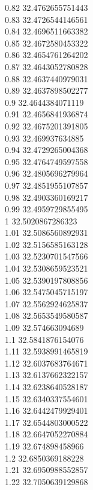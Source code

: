 {0.82	32.4762655751443\\
0.83	32.4726544146561\\
0.84	32.4696511663382\\
0.85	32.4672580453322\\
0.86	32.4654761264202\\
0.87	32.4643052780828\\
0.88	32.4637440979031\\
0.89	32.4637898502277\\
0.9	32.4644384071119\\
0.91	32.4656841936874\\
0.92	32.4675201391805\\
0.93	32.469937634885\\
0.94	32.4729265004368\\
0.95	32.4764749597558\\
0.96	32.4805696279964\\
0.97	32.4851955107857\\
0.98	32.4903360169217\\
0.99	32.4959729855495\\
1	32.5020867286323\\
1.01	32.5086560892931\\
1.02	32.5156585163128\\
1.03	32.5230701547566\\
1.04	32.5308659523521\\
1.05	32.5390197808856\\
1.06	32.5475045715197\\
1.07	32.5562924625837\\
1.08	32.5653549580587\\
1.09	32.574663094689\\
1.1	32.5841876154076\\
1.11	32.5938991465819\\
1.12	32.6037683764671\\
1.13	32.6137662322157\\
1.14	32.6238640528187\\
1.15	32.6340337554601\\
1.16	32.6442479929401\\
1.17	32.6544803000522\\
1.18	32.6647052270884\\
1.19	32.674898458966\\
1.2	32.6850369188228\\
1.21	32.6950988552857\\
1.22	32.7050639129868\\
}
